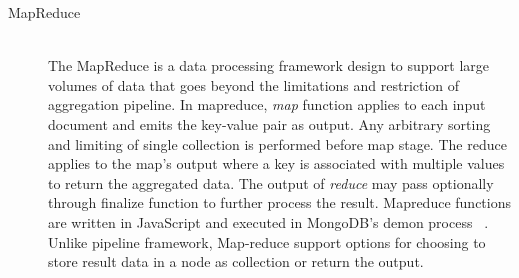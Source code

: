 \begin{description}
\item[MapReduce]  \hfill \\
		  The MapReduce is a data processing framework design to support large volumes of data that goes beyond the limitations and restriction of aggregation pipeline.  In mapreduce,  \textit{map} function applies to each input document and emits the key-value pair as output. Any arbitrary sorting and limiting  of single collection is performed before map stage. The reduce applies to the map's output where a key is associated with multiple values to return the aggregated data. The output of \textit{reduce} may pass optionally through finalize function to further process the result. Mapreduce functions are written in JavaScript and executed in MongoDB's demon process ~\cite{mongodbaggregation}.  Unlike pipeline framework, Map-reduce support options for choosing to store result  data in a node as collection or return the output.
		  
\end{description}

